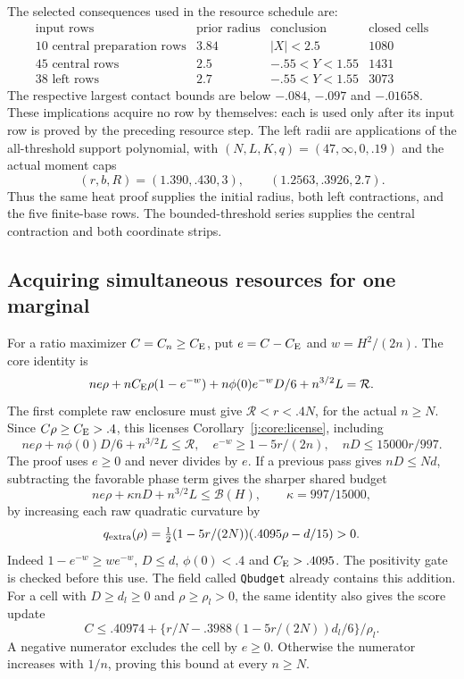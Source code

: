 The selected consequences used in the resource schedule are:
\[
\begin{array}{l|c|c|r}
\text{input rows}&\text{prior radius}&\text{conclusion}&\text{closed cells}\\\hline
10\text{ central preparation rows}&3.84&|X|<2.5&1080\\
45\text{ central rows}&2.5&-.55<Y<1.55&1431\\
38\text{ left rows}&2.7&-.55<Y<1.55&3073
\end{array}
\]
The respective largest contact bounds are below $-.084$, $-.097$ and
$-.01658$. These implications acquire no row by themselves: each is
used only after its input row is proved by the preceding resource step.
The left radii are applications of the all-threshold support polynomial,
with $(N,L,K,q)=(47,\infty,0,.19)$ and the actual moment caps
\[
 (r,b,R)=(1.390,.430,3),\qquad (1.2563,.3926,2.7).
\]
Thus the same heat proof supplies the initial radius, both left
contractions, and the five finite-base rows. The bounded-threshold
series supplies the central contraction and both coordinate strips.




\subsection{Acquiring simultaneous resources for one marginal}\label{j:local:sign}
For a ratio maximizer $C=C_n\ge C_{\mathrm E}$, put $e=C-C_{\mathrm E}$ and $w=H^2/(2n)$.
The core identity is
\[
 ne\rho+nC_{\mathrm E}\rho(1-e^{-w})+n\phi(0)e^{-w}D/6+n^{3/2}L=\mathcal R.
\]
The first complete raw enclosure must give $\mathcal R<r<.4N$, for the
actual $n\ge N$. Since $C\rho\ge C_{\mathrm E}>.4$, this licenses
Corollary~\ref{j:core:license}, including
\[
 ne\rho+n\phi(0)D/6+n^{3/2}L\le\mathcal R,\quad
 e^{-w}\ge1-5r/(2n),\quad nD\le15000r/997.
\]
The proof uses $e\ge0$ and never divides by $e$.
If a previous pass gives $nD\le Nd$, subtracting the favorable phase
term gives the sharper shared budget
\begin{equation}\label{j:local:budget}
 ne\rho+\kappa nD+n^{3/2}L\le\mathcal B(H),\qquad\kappa=997/15000,
\end{equation}
by increasing each raw quadratic curvature by
\begin{equation}\label{j:local:re:extra}
 q_{\rm extra}(\rho)=\tfrac12(1-5r/(2N))(.4095\rho-d/15)>0.
\end{equation}
Indeed $1-e^{-w}\ge we^{-w}$, $D\le d$, $\phi(0)<.4$ and
$C_{\mathrm E}>.4095$. The positivity gate is checked before this use.
The field called \texttt{Qbudget} already contains this addition.
For a cell with $D\ge d_l\ge0$ and $\rho\ge\rho_l>0$, the same identity
also gives the score update
\[
 C\le .40974+\{r/N-.3988(1-5r/(2N))d_l/6\}/\rho_l.
\]
A negative numerator excludes the cell by $e\ge0$. Otherwise the numerator
increases with $1/n$, proving this bound at every $n\ge N$.


